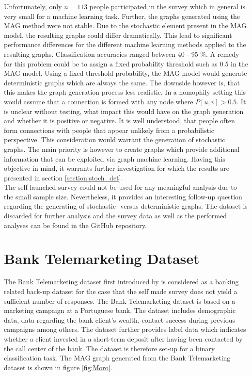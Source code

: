   \noindent Unfortunately, only $n=113$ people participated in the survey which 
  in general is very small for a machine learning task.
  Further, the graphs generated using the MAG method were not stable. Due to
  the stochastic element present in the MAG model, the resulting graphs could
  differ dramatically. This lead to significant performance differences for the
  different machine learning methods applied to the resulting graphs.
  Classification accuracies ranged between 40 - 95 \%. A remedy for this 
  problem could be to assign a fixed probability threshold such as 0.5 in the 
  MAG model. Using a fixed threshold probability, the MAG model would 
  generate deterministic graphs which are always the same. The downside however 
  is, that this makes the graph generation process less realistic. In a
  homophily setting this would assume that a connection is formed with any node 
  where $P[u,v]>0.5$. It is unclear without testing, what impact this would
  have on the graph generation and whether it is positive or negative. It is
  well understood, that people often form connections with people that appear
  unlikely from a probabilistic perspective. This consideration would warrant
  the generation of stochastic graphs. The main priority is however to create
  graphs which provide additional information that can be exploited via graph
  machine learning. Having this objective in mind, it warrants further
  investigation for which the results are presented in section 
  \ref{section:stoch_det}. \\

  \noindent The self-launched survey could not be used for any meaningful
  analysis due to the small sample size. Nevertheless, it provides an
  interesting follow-up question regarding the generating of
  stochastic- versus deterministic graphs. The dataset is discarded for
  further analysis and the survey data as well as the performed analyses can be
  found in the GitHub repository. 

  \section{Bank Telemarketing Dataset}
  \label{section:bank_data}

  The Bank Telemarketing dataset first introduced by 
  \cite{moro2011using,moro2014data} is considered as a banking related back-up 
  dataset for the case that the self made survey does not yield a sufficient 
  number of responses. The Bank Telemarketing dataset is based on a marketing 
  campaign at a Portuguese bank. The dataset includes demographic data, data 
  regarding the bank client's wealth, contact success during previous campaigns
  among others. The dataset further provides label data which indicates whether 
  a client invested in a short-term deposit after having been contacted by the
  call center of the bank. The dataset is therefore set-up for a binary 
  classification task. The MAG graph generated from the Bank Telemarketing 
  dataset is shown in figure \ref{fig:Moro}.
 
